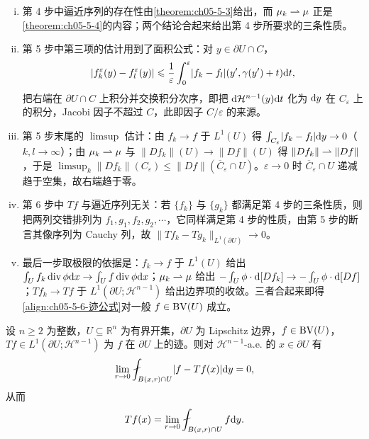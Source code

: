 \documentclass[../../main.tex]{subfiles}%
\begin{document}
\begin{remark}\label{remark:ch05-def-5-3-逼近}
\begin{enumerate}[(i)]
\item 第 4 步中逼近序列的存在性由\cref{theorem:ch05-5-3}给出，而 $\mu_k\rightharpoonup\mu$ 正是\cref{theorem:ch05-5-4}的内容；两个结论合起来给出第 4 步所要求的三条性质。%
\item 第 5 步中第三项的估计用到了面积公式：对 $y\in\partial U\cap C$，
\begin{align*}
\lvert f_k^{\varepsilon}(y)-f_l^{\varepsilon}(y)\rvert\leqslant\frac{1}{\varepsilon}\int_0^{\varepsilon}\lvert f_k-f_l\rvert(y',\gamma(y')+t)\mathrm{d} t,
\end{align*}
把右端在 $\partial U\cap C$ 上积分并交换积分次序，即把 $\mathrm{d}\mathcal{H}^{n-1}(y)\mathrm{d} t$ 化为 $\mathrm{d} y$ 在 $C_{\varepsilon}$ 上的积分，Jacobi 因子不超过 $C$，此即因子 $C/\varepsilon$ 的来源。
\item 第 5 步末尾的 $\limsup$ 估计：由 $f_k\to f$ 于 $L^1(U)$ 得 $\int_{C_{\varepsilon}}\lvert f_k-f_l\rvert\mathrm{d} y\to0$（$k,l\to\infty$）；由 $\mu_k\rightharpoonup\mu$ 与 $\lVert Df_k\rVert(U)\to\lVert Df\rVert(U)$ 得 $\lVert Df_k\rVert\rightharpoonup\lVert Df\rVert$，于是 $\limsup_k\lVert Df_k\rVert(C_{\varepsilon})\leqslant\lVert Df\rVert(\overline{C}_{\varepsilon}\cap U)$。$\varepsilon\to0$ 时 $\overline{C}_{\varepsilon}\cap U$ 递减趋于空集，故右端趋于零。
\item 第 6 步中 $Tf$ 与逼近序列无关：若 $\{f_k\}$ 与 $\{g_k\}$ 都满足第 4 步的三条性质，则把两列交错排列为 $f_1,g_1,f_2,g_2,\cdots$，它同样满足第 4 步的性质，由第 5 步的断言其像序列为 Cauchy 列，故 $\lVert Tf_k-Tg_k\rVert_{L^1(\partial U)}\to0$。
\item 最后一步取极限的依据是：$f_k\to f$ 于 $L^1(U)$ 给出 $\int_U f_k\operatorname{div}\phi\mathrm{d} x\to\int_U f\operatorname{div}\phi\mathrm{d} x$；$\mu_k\rightharpoonup\mu$ 给出 $-\int_U\phi\cdot\mathrm{d}[Df_k]\to-\int_U\phi\cdot\mathrm{d}[Df]$；$Tf_k\to Tf$ 于 $L^1(\partial U;\mathcal{H}^{n-1})$ 给出边界项的收敛。三者合起来即得\eqref{align:ch05-5-6-迹公式}对一般 $f\in\mathrm{BV}(U)$ 成立。
\end{enumerate}
\end{remark}

\begin{theorem}[迹的局部性质]\label{theorem:ch05-5-7}
设 $n\geqslant2$ 为整数，$U\subseteq\mathbb{R}^n$ 为有界开集，$\partial U$ 为 Lipschitz 边界，$f\in\mathrm{BV}(U)$，$Tf\in L^1(\partial U;\mathcal{H}^{n-1})$ 为 $f$ 在 $\partial U$ 上的迹。则对 $\mathcal{H}^{n-1}$-a.e. 的 $x\in\partial U$ 有
\begin{align*}
\lim_{r\to0}\fint_{B(x,r)\cap U}\lvert f-Tf(x)\rvert\diff y=0,
\end{align*}
从而
\begin{align*}
Tf(x)=\lim_{r\to0}\fint_{B(x,r)\cap U}f\diff y .
\end{align*}
\end{theorem}
\end{document}

